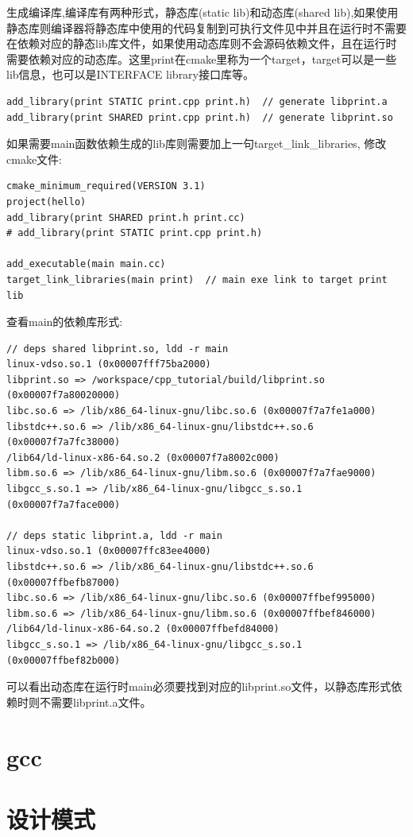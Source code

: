 \documentclass[12pt]{book}
\begin{document}
生成编译库,编译库有两种形式，静态库(static lib)和动态库(shared lib),如果使用静态库则编译器将静态库中使用的代码复制到可执行文件见中并且在运行时不需要在依赖对应的静态lib库文件，如果使用动态库则不会源码依赖文件，且在运行时需要依赖对应的动态库。这里print在cmake里称为一个target，target可以是一些lib信息，也可以是INTERFACE library接口库等。
\begin{lstlisting}
add_library(print STATIC print.cpp print.h)  // generate libprint.a
add_library(print SHARED print.cpp print.h)  // generate libprint.so
\end{lstlisting}
如果需要main函数依赖生成的lib库则需要加上一句target\_link\_libraries, 修改cmake文件:
\begin{lstlisting}
cmake_minimum_required(VERSION 3.1)
project(hello)
add_library(print SHARED print.h print.cc)
# add_library(print STATIC print.cpp print.h)

add_executable(main main.cc)
target_link_libraries(main print)  // main exe link to target print lib
\end{lstlisting}
查看main的依赖库形式:
\begin{lstlisting}
// deps shared libprint.so, ldd -r main
linux-vdso.so.1 (0x00007fff75ba2000)
libprint.so => /workspace/cpp_tutorial/build/libprint.so (0x00007f7a80020000)
libc.so.6 => /lib/x86_64-linux-gnu/libc.so.6 (0x00007f7a7fe1a000)
libstdc++.so.6 => /lib/x86_64-linux-gnu/libstdc++.so.6 (0x00007f7a7fc38000)
/lib64/ld-linux-x86-64.so.2 (0x00007f7a8002c000)
libm.so.6 => /lib/x86_64-linux-gnu/libm.so.6 (0x00007f7a7fae9000)
libgcc_s.so.1 => /lib/x86_64-linux-gnu/libgcc_s.so.1 (0x00007f7a7face000)

// deps static libprint.a, ldd -r main
linux-vdso.so.1 (0x00007ffc83ee4000)
libstdc++.so.6 => /lib/x86_64-linux-gnu/libstdc++.so.6 (0x00007ffbefb87000)
libc.so.6 => /lib/x86_64-linux-gnu/libc.so.6 (0x00007ffbef995000)
libm.so.6 => /lib/x86_64-linux-gnu/libm.so.6 (0x00007ffbef846000)
/lib64/ld-linux-x86-64.so.2 (0x00007ffbefd84000)
libgcc_s.so.1 => /lib/x86_64-linux-gnu/libgcc_s.so.1 (0x00007ffbef82b000)
\end{lstlisting}
可以看出动态库在运行时main必须要找到对应的libprint.so文件，以静态库形式依赖时则不需要libprint.a文件。

\section{gcc}
\section{设计模式}
\end{document}
